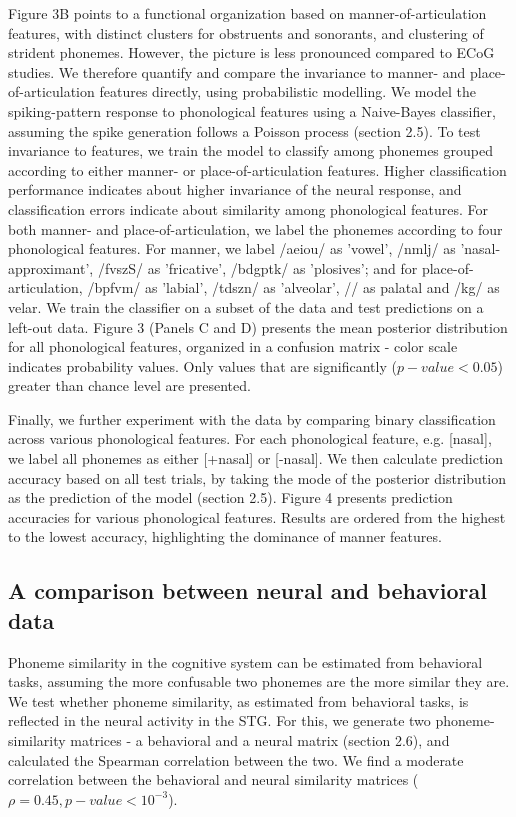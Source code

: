 Figure 3B points to a functional organization based on manner-of-articulation features, with distinct clusters for obstruents and sonorants, and clustering of strident phonemes. However, the picture is less pronounced compared to ECoG studies. We therefore quantify and compare the invariance to manner- and place-of-articulation features directly, using probabilistic modelling. We model the spiking-pattern response to phonological features using a Naive-Bayes classifier, assuming the spike generation follows a Poisson process (section 2.5). To test invariance to features, we train the model to classify among phonemes grouped according to either manner- or place-of-articulation features. Higher classification performance indicates about higher invariance of the neural response, and classification errors indicate about similarity among phonological features. For both manner- and place-of-articulation, we label the phonemes according to four phonological features. For manner, we label /aeiou/ as 'vowel', /nmlj/ as 'nasal-approximant', /fvszS/ as 'fricative', /bdgptk/ as 'plosives'; and for place-of-articulation, /bpfvm/ as 'labial', /tdszn/ as 'alveolar', // as palatal and /kg/ as velar. We train the classifier on a subset of the data and test predictions on a left-out data. Figure 3 (Panels C and D) presents the mean posterior distribution for all phonological features, organized in a confusion matrix - color scale indicates probability values. Only values that are significantly ($p-value<0.05$) greater than chance level are presented.

Finally, we further experiment with the data by comparing binary classification across various phonological features. For each phonological feature, e.g. [nasal], we label all phonemes as either [+nasal] or [-nasal]. We then calculate prediction accuracy based on all test trials, by taking the mode of the posterior distribution as the prediction of the model (section 2.5). Figure 4 presents prediction accuracies for various phonological features. Results are ordered from the highest to the lowest accuracy, highlighting the dominance of manner features.


\subsection{A comparison between neural and behavioral data}
Phoneme similarity in the cognitive system can be estimated from behavioral tasks, assuming the more confusable two phonemes are the more similar they are. We test whether phoneme similarity, as estimated from behavioral tasks, is reflected in the neural activity in the STG. For this, we generate two phoneme-similarity matrices - a behavioral and a neural matrix (section 2.6), and calculated the Spearman correlation between the two. We find a moderate correlation between the behavioral and neural similarity matrices ($\rho = 0.45, p-value < 10^{-3}$).


